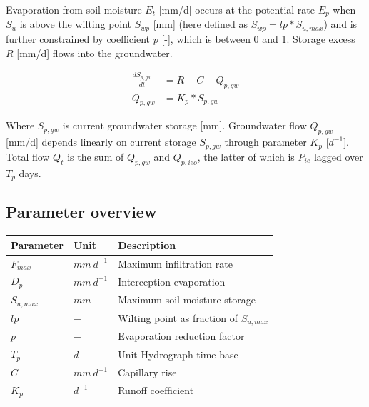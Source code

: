\noindent Evaporation from soil moisture $E_t$ [mm/d] occurs at the potential rate $E_p$ when $S_u$ is above the wilting point $S_{wp}$ [mm] (here defined as $S_{wp} = lp*S_{u,max}$) and is further constrained by coefficient $p$ [-], which is between 0 and 1. Storage excess $R$ [mm/d] flows into the groundwater. 

\begin{align}
	\frac{dS_{p,gw}}{dt} &=R-C-Q_{p,gw} \\
	Q_{p,gw} &= K_p*S_{p,gw}
\end{align}

Where $S_{p,gw}$ is current groundwater storage [mm]. Groundwater flow $Q_{p,gw}$ [mm/d] depends linearly on current storage $S_{p,gw}$ through parameter $K_p$ [$d^{-1}$]. Total flow $Q_t$ is the sum of $Q_{p,gw}$ and $Q_{p,ieo}$, the latter of which is $P_{ie}$ lagged over $T_p$ days.

\subsection{Parameter overview}
\begin{table}[htbp]
  \centering
    \begin{tabular}{lll}
    \toprule
    Parameter & Unit  & Description \\
    \midrule
    $F_{max}$ & $mm~d^{-1}$ & Maximum infiltration rate \\
    $D_p$ & $mm~d^{-1}$ & Interception evaporation  \\
    $S_{u,max}$ & $mm$  & Maximum soil moisture storage \\
    $lp$  & $-$   & Wilting point as fraction of $S_{u,max}$ \\
    $p$   & $-$   & Evaporation reduction factor \\
    $T_p$ & $d$   & Unit Hydrograph time base \\
    $C$   & $mm~d^{-1}$ & Capillary rise \\
    $K_p$ & $d^{-1}$ & Runoff coefficient \\
    \bottomrule
    \end{tabular}%
  \label{tab:addlabel}%
\end{table}%


